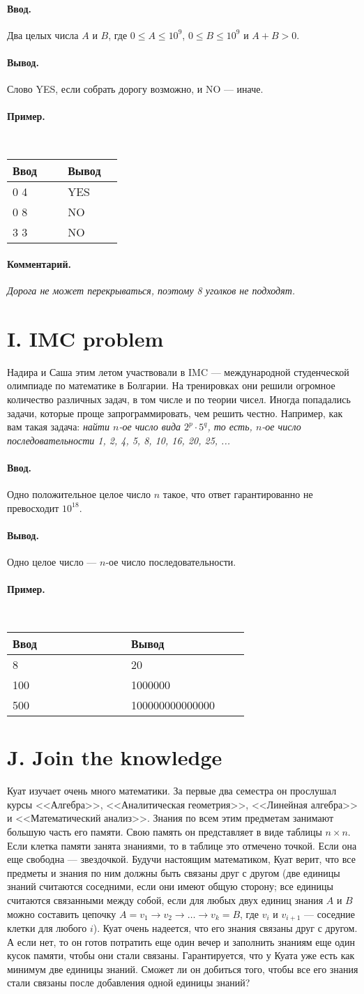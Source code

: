 \documentclass[12pt, a5paper]{article}
\newcommand{\informat}[1]
{
	\paragraph{Ввод.\\} #1
}
\newcommand{\outformat}[1]
{
	\paragraph{Вывод.\\} #1
}
\newcommand{\exampleee}[6]
{
	\paragraph{Пример.\\}
	{\tt
	\begin{tabular}{|p{0.4\linewidth}|p{0.4\linewidth}|}
	\hline
	Ввод 	& Вывод  	\\
	\hline
	#1 		& #2 		\\
	\hline
	#3		& #4		\\
	\hline
	#5		& #6		\\
	\hline
	\end{tabular}
	}
}
\newcommand{\excomm}[1]
{
	\paragraph{Комментарий. \\}
	\textit{#1}
}
\begin{document}
\informat{Два целых числа $A$ и $B$, где $0 \le A \le 10^9$, $0 \le B \le 10^9$ и $A + B > 0$.}

\outformat{Слово YES, если собрать дорогу возможно, и NO --- иначе.}

\exampleee{0 4}{YES}{0 8}{NO}{3 3}{NO}

\excomm{Дорога не может перекрываться, поэтому 8 уголков не подходят.}


\section*{I. IMC problem}

Надира и Саша этим летом участвовали в IMC --- международной студенческой олимпиаде по математике в Болгарии. На тренировках они решили огромное количество различных задач, в том числе и по теории чисел. Иногда попадались задачи, которые проще запрограммировать, чем решить честно. Например, как вам такая задача:\newline
\textit{найти $n$-ое число вида $2^p \cdot 5^q$, то есть, $n$-ое число последовательности 1, 2, 4, 5, 8, 10, 16, 20, 25, ...}

\informat{Одно положительное целое число $n$ такое, что ответ гарантированно не превосходит $10^{18}$.}

\outformat{Одно целое число --- $n$-ое число последовательности.}

\exampleee{8}{20}{100}{1000000}{500}{100000000000000}

\newpage

\section*{J. Join the knowledge}

Куат изучает очень много математики. За первые два семестра он прослушал курсы <<Алгебра>>, <<Аналитическая геометрия>>, <<Линейная алгебра>> и <<Математический анализ>>. Знания по всем этим предметам занимают большую часть его памяти. Свою память он представляет в виде таблицы $n \times n$. Если клетка памяти занята знаниями, то в таблице это отмечено точкой. Если она еще свободна --- звездочкой. Будучи настоящим математиком, Куат верит, что все предметы и знания по ним должны быть связаны друг с другом (две единицы знаний считаются соседними, если они имеют общую сторону; все единицы считаются связанными между собой, если для любых двух единиц знания $A$ и $B$ можно составить цепочку $A = v_1 \rightarrow v_2 \rightarrow \dots \rightarrow v_k = B$, где $v_i$ и $v_{i+1}$ --- соседние клетки для любого $i$). Куат очень надеется, что его знания связаны друг с другом. А если нет, то он готов потратить еще один вечер и заполнить знаниям еще один кусок памяти, чтобы они стали связаны. Гарантируется, что у Куата уже есть как минимум две единицы знаний. Сможет ли он добиться того, чтобы все его знания стали связаны после добавления одной единицы знаний?
\end{document}
